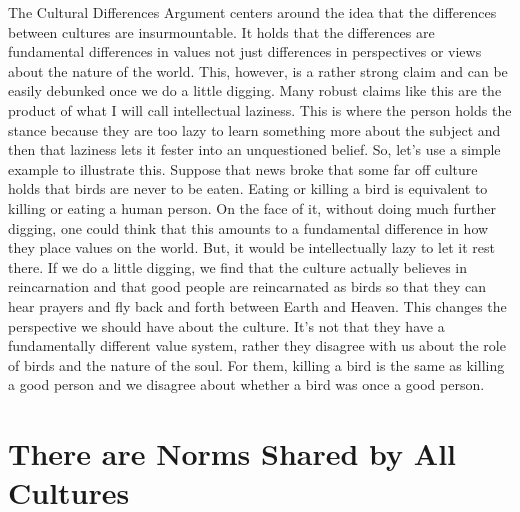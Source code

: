 The Cultural Differences Argument centers around the idea that the differences between cultures are insurmountable. It holds that the differences are fundamental differences in values not just differences in perspectives or views about the nature of the world. This, however, is a rather strong claim and can be easily debunked once we do a little digging. Many robust claims like this are the product of what I will call intellectual laziness. This is where the person holds the stance because they are too lazy to learn something more about the subject and then that laziness lets it fester into an unquestioned belief. So, let's use a simple example to illustrate this. Suppose that news broke that some far off culture holds that birds are never to be eaten. Eating or killing a bird is equivalent to killing or eating a human person. On the face of it, without doing much further digging, one could think that this amounts to a fundamental difference in how they place values on the world. But, it would be intellectually lazy to let it rest there. If we do a little digging, we find that the culture actually believes in reincarnation and that good people are reincarnated as birds so that they can hear prayers and fly back and forth between Earth and Heaven. This changes the perspective we should have about the culture. It's not that they have a fundamentally different value system, rather they disagree with us about the role of birds and the nature of the soul. For them, killing a bird is the same as killing a good person and we disagree about whether a bird was once a good person. 

\section{There are Norms Shared by All Cultures}

